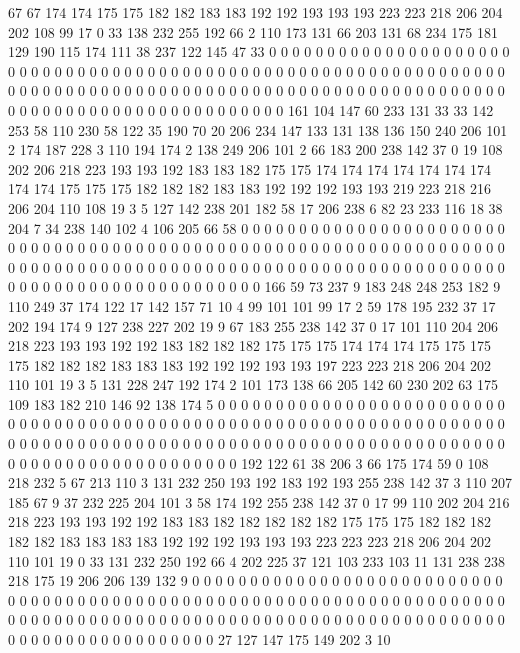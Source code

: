 67 67 174 174 175 175 182 182 183 183 192 192 193 193 193 223 223 218 206 204
202 108 99 17 0 33 138 232 255 192 66 2 110 173 131 66 203 131 68 234
175 181 129 190 115 174 111 38 237 122 145 47 33 0 0 0 0 0 0 0
0 0 0 0 0 0 0 0 0 0 0 0 0 0 0 0 0 0 0 0
0 0 0 0 0 0 0 0 0 0 0 0 0 0 0 0 0 0 0 0
0 0 0 0 0 0 0 0 0 0 0 0 0 0 0 0 0 0 0 0
0 0 0 0 0 0 0 0 0 0 0 0 0 0 0 0 0 0 0 0
0 0 0 0 0 0 0 0 0 0 0 0 0 0 0 0 0 0 0 0
0 0 0 0 0 0 0 0 0 0 0 0 0 0 0 0 0 0 0 0
0 0 0 0 161 104 147 60 233 131 33 33 142 253 58 110 230 58 122 35
190 70 20 206 234 147 133 131 138 136 150 240 206 101 2 174 187 228 3 110
194 174 2 138 249 206 101 2 66 183 200 238 142 37 0 19 108 202 206 218
223 193 193 192 183 183 182 175 175 174 174 174 174 174 174 174 174 174 175 175
175 182 182 182 183 183 192 192 192 193 193 219 223 218 216 206 204 110 108 19
3 5 127 142 238 201 182 58 17 206 238 6 82 23 233 116 18 38 204 7
34 238 140 102 4 106 205 66 58 0 0 0 0 0 0 0 0 0 0 0
0 0 0 0 0 0 0 0 0 0 0 0 0 0 0 0 0 0 0 0
0 0 0 0 0 0 0 0 0 0 0 0 0 0 0 0 0 0 0 0
0 0 0 0 0 0 0 0 0 0 0 0 0 0 0 0 0 0 0 0
0 0 0 0 0 0 0 0 0 0 0 0 0 0 0 0 0 0 0 0
0 0 0 0 0 0 0 0 0 0 0 0 0 0 0 0 0 0 0 0
0 0 0 0 0 0 0 0 0 0 0 0 0 0 0 0 0 0 0 0
166 59 73 237 9 183 248 248 253 182 9 110 249 37 174 122 17 142 157 71
10 4 99 101 101 99 17 2 59 178 195 232 37 17 202 194 174 9 127 238
227 202 19 9 67 183 255 238 142 37 0 17 101 110 204 206 218 223 193 193
192 192 183 182 182 182 175 175 175 174 174 174 175 175 175 175 182 182 182 183
183 183 192 192 192 193 193 197 223 223 218 206 204 202 110 101 19 3 5 131
228 247 192 174 2 101 173 138 66 205 142 60 230 202 63 175 109 183 182 210
146 92 138 174 5 0 0 0 0 0 0 0 0 0 0 0 0 0 0 0
0 0 0 0 0 0 0 0 0 0 0 0 0 0 0 0 0 0 0 0
0 0 0 0 0 0 0 0 0 0 0 0 0 0 0 0 0 0 0 0
0 0 0 0 0 0 0 0 0 0 0 0 0 0 0 0 0 0 0 0
0 0 0 0 0 0 0 0 0 0 0 0 0 0 0 0 0 0 0 0
0 0 0 0 0 0 0 0 0 0 0 0 0 0 0 0 0 0 0 0
0 0 0 0 0 0 0 0 0 0 0 0 0 0 0 0 192 122 61 38
206 3 66 175 174 59 0 108 218 232 5 67 213 110 3 131 232 250 193 192
183 192 193 255 238 142 37 3 110 207 185 67 9 37 232 225 204 101 3 58
174 192 255 238 142 37 0 17 99 110 202 204 216 218 223 193 193 192 192 183
183 182 182 182 182 182 175 175 175 182 182 182 182 182 183 183 183 183 192 192
192 193 193 193 223 223 223 218 206 204 202 110 101 19 0 33 131 232 250 192
66 4 202 225 37 121 103 233 103 11 131 238 238 218 175 19 206 206 139 132
9 0 0 0 0 0 0 0 0 0 0 0 0 0 0 0 0 0 0 0
0 0 0 0 0 0 0 0 0 0 0 0 0 0 0 0 0 0 0 0
0 0 0 0 0 0 0 0 0 0 0 0 0 0 0 0 0 0 0 0
0 0 0 0 0 0 0 0 0 0 0 0 0 0 0 0 0 0 0 0
0 0 0 0 0 0 0 0 0 0 0 0 0 0 0 0 0 0 0 0
0 0 0 0 0 0 0 0 0 0 0 0 0 0 0 0 0 0 0 0
0 0 0 0 0 0 0 0 0 0 0 0 27 127 147 175 149 202 3 10
